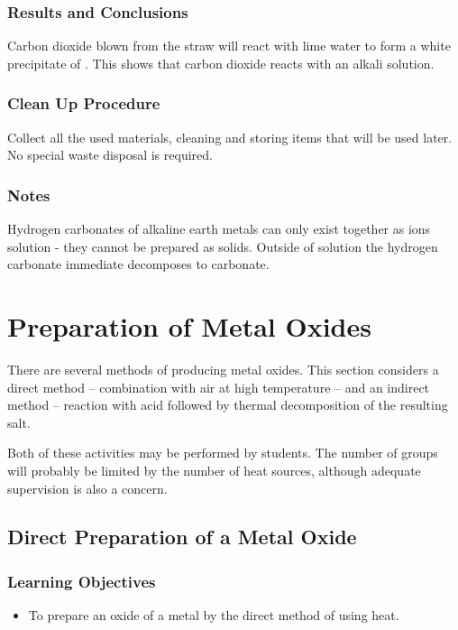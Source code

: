 \subsubsection*{Results and Conclusions}
Carbon dioxide blown from the straw will react with lime water  to form a white precipitate of . This shows that carbon dioxide reacts with an alkali solution.

\subsubsection*{Clean Up Procedure}
Collect all the used materials, cleaning and storing items that will be used later. No special waste disposal is required.

\subsubsection*{Notes}
Hydrogen carbonates of alkaline earth metals can only exist together as ions solution - they cannot be prepared as solids. Outside of solution the hydrogen carbonate immediate decomposes to carbonate.

\section{Preparation of Metal Oxides}

There are several methods of producing metal oxides. This section considers a direct method -- combination with air at high temperature -- and an indirect method -- reaction with acid followed by thermal decomposition of the resulting salt.

Both of these activities may be performed by students. The number of groups will probably be limited by the number of heat sources, although adequate supervision is also a concern.

\subsection{Direct Preparation of a Metal Oxide}

\subsubsection*{Learning Objectives}
\begin{itemize}
\item{To prepare an oxide of a metal by the direct method of using heat.}
\end{itemize}

